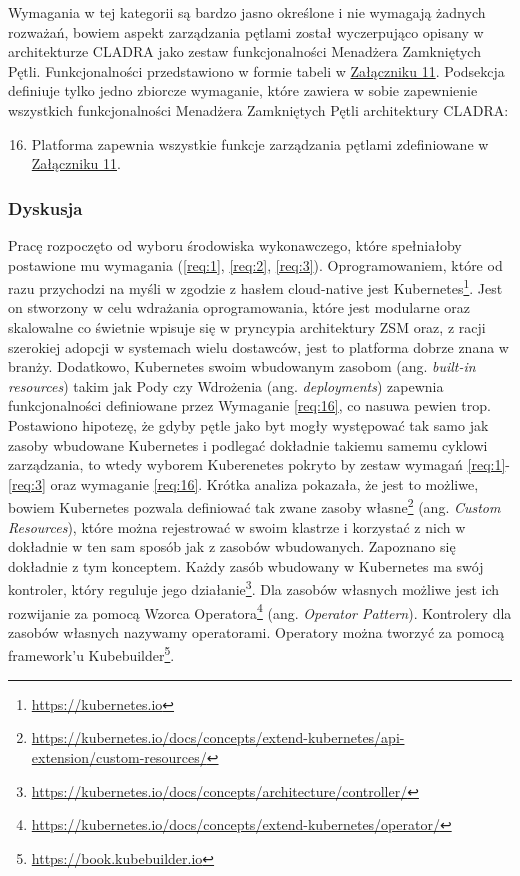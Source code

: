 Wymagania w tej kategorii są bardzo jasno określone i nie wymagają żadnych rozważań, bowiem aspekt zarządzania pętlami został wyczerpująco opisany w architekturze CLADRA jako zestaw funkcjonalności Menadżera Zamkniętych Pętli. Funkcjonalności przedstawiono w formie tabeli w \hyperlink{appendix:11}{Załączniku 11}. Podsekcja definiuje tylko jedno zbiorcze wymaganie, które zawiera w sobie zapewnienie wszystkich funkcjonalności Menadżera Zamkniętych Pętli architektury CLADRA:

\begin{enumerate}
    \setcounter{enumi}{15} 
    \item \label{req:16} Platforma zapewnia wszystkie funkcje zarządzania pętlami zdefiniowane w \hyperlink{appendix:11}{Załączniku 11}.
\end{enumerate}

\subsubsection{Dyskusja}

Pracę rozpoczęto od wyboru środowiska wykonawczego, które spełniałoby postawione mu wymagania (\ref{req:1}, \ref{req:2}, \ref{req:3}). Oprogramowaniem, które od razu przychodzi na myśli w zgodzie z hasłem cloud-native jest Kubernetes\footnote{\url{https://kubernetes.io}}. Jest on stworzony w celu wdrażania oprogramowania, które jest modularne oraz skalowalne co świetnie wpisuje się w pryncypia architektury ZSM oraz, z racji szerokiej adopcji w systemach wielu dostawców, jest to platforma dobrze znana w branży. Dodatkowo, Kubernetes swoim wbudowanym zasobom (ang. \textit{built-in resources}) takim jak Pody czy Wdrożenia (ang. \textit{deployments}) zapewnia funkcjonalności definiowane przez Wymaganie \ref{req:16}, co nasuwa pewien trop. Postawiono hipotezę, że gdyby pętle jako byt mogły występować tak samo jak zasoby wbudowane Kubernetes i podlegać dokładnie takiemu samemu cyklowi zarządzania, to wtedy wyborem Kuberenetes pokryto by zestaw wymagań \ref{req:1}-\ref{req:3} oraz wymaganie \ref{req:16}. Krótka analiza pokazała, że jest to możliwe, bowiem Kubernetes pozwala definiować tak zwane zasoby własne\footnote{\url{https://kubernetes.io/docs/concepts/extend-kubernetes/api-extension/custom-resources/}} (ang. \textit{Custom Resources}), które można rejestrować w swoim klastrze i korzystać z nich w dokładnie w ten sam sposób jak z zasobów wbudowanych. Zapoznano się dokładnie z tym konceptem. Każdy zasób wbudowany w Kubernetes ma swój kontroler, który reguluje jego działanie\footnote{\url{https://kubernetes.io/docs/concepts/architecture/controller/}}. Dla zasobów własnych możliwe jest ich rozwijanie za pomocą Wzorca Operatora\footnote{\url{https://kubernetes.io/docs/concepts/extend-kubernetes/operator/}} (ang. \textit{Operator Pattern}). Kontrolery dla zasobów własnych nazywamy operatorami. Operatory można tworzyć za pomocą framework'u Kubebuilder\footnote{\url{https://book.kubebuilder.io}}.

